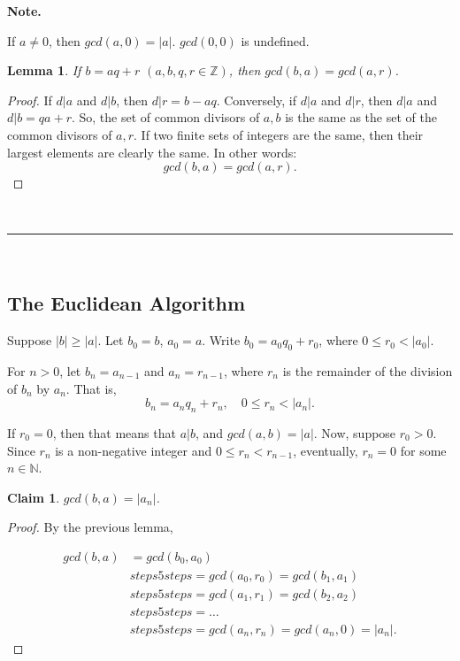 \documentclass[a4paper,12pt]{report}
\newcommand{\abs}[1]{\left|#1\right|}
\newcommand{\class}{}
\newcounter{statement}
\numberwithin{statement}{chapter}
\newtheorem{lemma}[statement]{Lemma}
\newtheorem{claim}[statement]{Claim}
\numberwithin{equation}{chapter}
\numberwithin{section}{chapter}
\numberwithin{subsection}{section}
\begin{document}
 {\bf Note.} 

If $a \neq 0$, then $gcd(a, 0) = \abs{a}$.
$gcd(0, 0)$ is undefined.




\begin{lemma}

If $b = aq + r$ $(a, b, q, r \in \mathbb{Z})$, then
$gcd(b, a) = gcd (a, r)$.
\end{lemma}
\begin{proof}

If $d | a$ and $d | b$, then $d | r = b - aq$.
Conversely, if $d | a$ and $d | r$, then $d|a$ and $d|b = qa+r$.
So, the set of common divisors of $a, b$ is the same as the set of the common divisors of $a, r$.
If two finite sets of integers are the same, then their largest elements are clearly the same.
In other words:
\[
gcd(b, a) = gcd(a, r).
\]


\end{proof}




\quad\\\hrule
\quad\\
\subsection*{The Euclidean Algorithm}


Suppose $\abs{b} \geq \abs{a}$.  Let $b_0 = b$, $a_0 = a$.
Write $b_0 = a_0q_0 + r_0$, where $0 \leq r_0 < \abs{a_0}$.


For $n > 0$, let $b_n = a_{n - 1}$ and $a_n = r_{n - 1}$, where
$r_n$ is the remainder of the division of $b_n$ by $a_n$.  That is,
\[
b_n = a_nq_n + r_n, \quad  0 \leq r_n < \abs{a_n}.
\]

If $r_0 = 0$, then that means that $a | b$, and $gcd(a, b) = \abs{a}$.
Now, suppose $r_0 > 0$.
Since $r_n$ is a non-negative integer and  $0 \leq r_n < r_{n - 1}$,
eventually, $r_n = 0$ for some $n \in \mathbb{N}$.




\begin{claim}

$gcd(b, a) = \abs{a_n}$.

\end{claim}
\begin{proof}

By the previous lemma,

\[
\begin{split}
gcd(b, a) &= gcd(b_0, a_0)\\
 &
\class{steps5 steps}{= gcd(a_0, r_0) = gcd(b_1, a_1)}
\\
& 
\class{steps5 steps}{= gcd(a_1, r_1) = gcd(b_2, a_2)}
\\
& 
\class{steps5 steps}{= \ldots}
\\
& 
\class{steps5 steps}{
= gcd(a_{n}, r_{n}) = gcd(a_n, 0) = \abs{a_n}.
}
\end{split}
\]



\end{proof}
\end{document}
